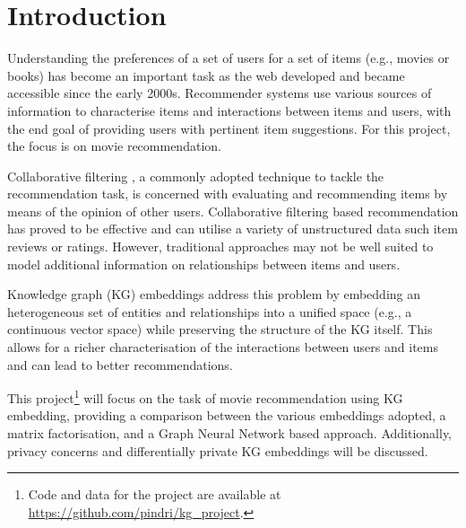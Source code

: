 




\maketitle



\section{Introduction}\label{sec:introduction}

Understanding the preferences of a set of users for a set of items (e.g., movies or books) has become an important task as the web developed and became accessible since the early 2000s.
Recommender systems \parencite{bobadilla2013recommender} use various sources of information to characterise items and interactions between items and users, with the end goal of providing users with pertinent item suggestions.
For this project, the focus is on movie recommendation.

Collaborative filtering \parencite{schafer2007collaborative}, a commonly adopted technique to tackle the recommendation task, is concerned with evaluating and recommending items by means of the opinion of other users.
Collaborative filtering based recommendation has proved to be effective \parencite{schafer2007collaborative, herlocker2004evaluating} and can utilise a variety of unstructured data such item reviews or ratings.
However, traditional approaches may not be well suited to model additional information on relationships between items and users.

Knowledge graph (KG) embeddings \parencite{wang2017knowledge} address this problem by embedding an heterogeneous set of entities and relationships into a unified space (e.g., a continuous vector space) while preserving the structure of the KG itself.
This allows for a richer characterisation of the interactions between users and items and can lead to better recommendations.

This project\footnote{Code and data for the project are available at \url{https://github.com/pindri/kg_project}.} will focus on the task of movie recommendation  using KG embedding, providing a comparison between the various embeddings adopted, a matrix factorisation, and a Graph Neural Network based approach.
Additionally, privacy concerns and differentially private KG embeddings will be discussed.








